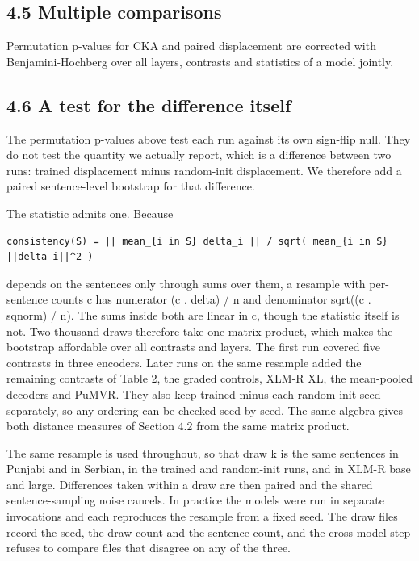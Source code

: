 \hypertarget{multiple-comparisons}{%
\subsection{4.5 Multiple comparisons}\label{multiple-comparisons}}

Permutation p-values for CKA and paired displacement are corrected with
Benjamini-Hochberg over all layers, contrasts and statistics of a model
jointly.

\hypertarget{a-test-for-the-difference-itself}{%
\subsection{4.6 A test for the difference
itself}\label{a-test-for-the-difference-itself}}

The permutation p-values above test each run against its own sign-flip
null. They do not test the quantity we actually report, which is a
difference between two runs: trained displacement minus random-init
displacement. We therefore add a paired sentence-level bootstrap for
that difference.

The statistic admits one. Because

\begin{verbatim}
consistency(S) = || mean_{i in S} delta_i || / sqrt( mean_{i in S} ||delta_i||^2 )
\end{verbatim}

depends on the sentences only through sums over them, a resample with
per-sentence counts c has numerator \textbar\textbar(c . delta) /
n\textbar\textbar{} and denominator sqrt((c . sqnorm) / n). The sums
inside both are linear in c, though the statistic itself is not. Two
thousand draws therefore take one matrix product, which makes the
bootstrap affordable over all contrasts and layers. The first run
covered five contrasts in three encoders. Later runs on the same
resample added the remaining contrasts of Table 2, the graded controls,
XLM-R XL, the mean-pooled decoders and PuMVR. They also keep trained
minus each random-init seed separately, so any ordering can be checked
seed by seed. The same algebra gives both distance measures of Section
4.2 from the same matrix product.

The same resample is used throughout, so that draw k is the same
sentences in Punjabi and in Serbian, in the trained and random-init
runs, and in XLM-R base and large. Differences taken within a draw are
then paired and the shared sentence-sampling noise cancels. In practice
the models were run in separate invocations and each reproduces the
resample from a fixed seed. The draw files record the seed, the draw
count and the sentence count, and the cross-model step refuses to
compare files that disagree on any of the three.

